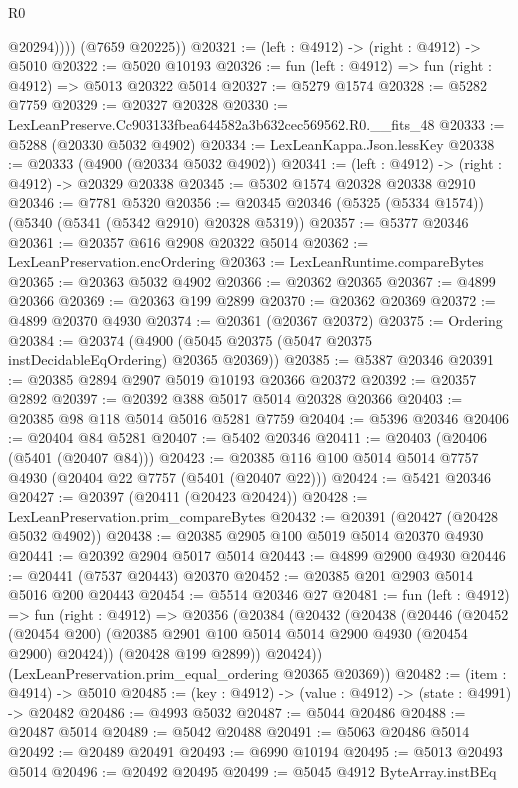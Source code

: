 \begin{lexlean}{R0}
\begin{coremodule}
              @20294))))
      (@7659 @20225))
@20321 := (left : @4912) -> (right : @4912) -> @5010
@20322 := @5020 @10193
@20326 := fun (left : @4912) => fun (right : @4912) => @5013 @20322 @5014
@20327 := @5279 @1574
@20328 := @5282 @7759
@20329 := @20327 @20328
@20330 := LexLeanPreserve.Cc903133fbea644582a3b632cec569562.R0.__fits_48
@20333 := @5288 (@20330 @5032 @4902)
@20334 := LexLeanKappa.Json.lessKey
@20338 := @20333 (@4900 (@20334 @5032 @4902))
@20341 := (left : @4912) -> (right : @4912) -> @20329 @20338
@20345 := @5302 @1574 @20328 @20338 @2910
@20346 := @7781 @5320
@20356 := @20345 @20346 (@5325 (@5334 @1574)) (@5340 (@5341 (@5342 @2910) @20328 @5319))
@20357 := @5377 @20346
@20361 := @20357 @616 @2908 @20322 @5014
@20362 := LexLeanPreservation.encOrdering
@20363 := LexLeanRuntime.compareBytes
@20365 := @20363 @5032 @4902
@20366 := @20362 @20365
@20367 := @4899 @20366
@20369 := @20363 @199 @2899
@20370 := @20362 @20369
@20372 := @4899 @20370 @4930
@20374 := @20361 (@20367 @20372)
@20375 := Ordering
@20384 := @20374 (@4900 (@5045 @20375 (@5047 @20375 instDecidableEqOrdering) @20365 @20369))
@20385 := @5387 @20346
@20391 := @20385 @2894 @2907 @5019 @10193 @20366 @20372
@20392 := @20357 @2892
@20397 := @20392 @388 @5017 @5014 @20328 @20366
@20403 := @20385 @98 @118 @5014 @5016 @5281 @7759
@20404 := @5396 @20346
@20406 := @20404 @84 @5281
@20407 := @5402 @20346
@20411 := @20403 (@20406 (@5401 (@20407 @84)))
@20423 := @20385 @116 @100 @5014 @5014 @7757 @4930 (@20404 @22 @7757 (@5401 (@20407 @22)))
@20424 := @5421 @20346
@20427 := @20397 (@20411 (@20423 @20424))
@20428 := LexLeanPreservation.prim_compareBytes
@20432 := @20391 (@20427 (@20428 @5032 @4902))
@20438 := @20385 @2905 @100 @5019 @5014 @20370 @4930
@20441 := @20392 @2904 @5017 @5014
@20443 := @4899 @2900 @4930
@20446 := @20441 (@7537 @20443) @20370
@20452 := @20385 @201 @2903 @5014 @5016 @200 @20443
@20454 := @5514 @20346 @27
@20481 := fun (left : @4912) =>
  fun (right : @4912) =>
  @20356
    (@20384
      (@20432
        (@20438
          (@20446
            (@20452 (@20454 @200) (@20385 @2901 @100 @5014 @5014 @2900 @4930 (@20454 @2900) @20424))
            (@20428 @199 @2899))
          @20424))
      (LexLeanPreservation.prim_equal_ordering @20365 @20369))
@20482 := (item : @4914) -> @5010
@20485 := (key : @4912) -> (value : @4912) -> (state : @4991) -> @20482
@20486 := @4993 @5032
@20487 := @5044 @20486
@20488 := @20487 @5014
@20489 := @5042 @20488
@20491 := @5063 @20486 @5014
@20492 := @20489 @20491
@20493 := @6990 @10194
@20495 := @5013 @20493 @5014
@20496 := @20492 @20495
@20499 := @5045 @4912 ByteArray.instBEq

\end{coremodule}
\end{lexlean}
